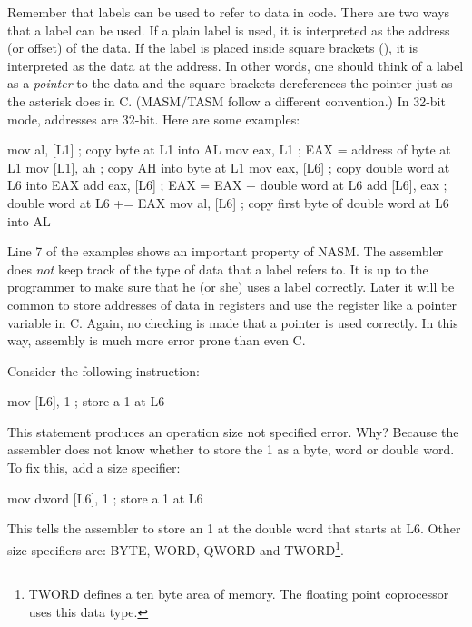 Remember that labels  can be used to refer to data in code. There are
two ways that a label can be used. If a plain label is used, it is
interpreted as the address (or offset) of the data. If the label is
placed inside square brackets ({\code []}), it is interpreted as the data at
the address. In other words, one should think of a label as a \emph{pointer}
to the data and the square brackets dereferences the pointer just as
the asterisk does in C. (MASM/TASM follow a different convention.) 
In 32-bit mode, addresses are 32-bit. Here are some examples:
\begin{AsmCodeListing}[frame=none]
      mov    al, [L1]      ; copy byte at L1 into AL
      mov    eax, L1       ; EAX = address of byte at L1
      mov    [L1], ah      ; copy AH into byte at L1
      mov    eax, [L6]     ; copy double word at L6 into EAX
      add    eax, [L6]     ; EAX = EAX + double word at L6
      add    [L6], eax     ; double word at L6 += EAX
      mov    al, [L6]      ; copy first byte of double word at L6 into AL
\end{AsmCodeListing}
Line 7 of the examples shows an important property of NASM. The assembler does
\emph{not} keep track of the type of data that a label refers to. It is up
to the programmer to make sure that he (or she) uses a label correctly. Later
it will be common to store addresses of data in registers and use the register
like a pointer variable in C. Again, no checking is made that a pointer is
used correctly. In this way, assembly is much more error prone than even C.

Consider the following instruction:
\begin{AsmCodeListing}[frame=none, numbers=none]
      mov    [L6], 1             ; store a 1 at L6
\end{AsmCodeListing}
This statement produces an {\code operation size not specified} error. Why?
Because the assembler does not know whether to store the 1 as a byte, word
or double word. To fix this, add a size specifier:
\begin{AsmCodeListing}[frame=none, numbers=none]
      mov    dword [L6], 1       ; store a 1 at L6
\end{AsmCodeListing}
This tells the assembler to store an 1 at the double word that starts at
{\code L6}. Other size specifiers are: {\code BYTE}, {\code WORD},
{\code QWORD} and {\code TWORD}\footnote{{\code TWORD} defines a ten byte
area of memory. The floating point coprocessor uses this data type.}.


